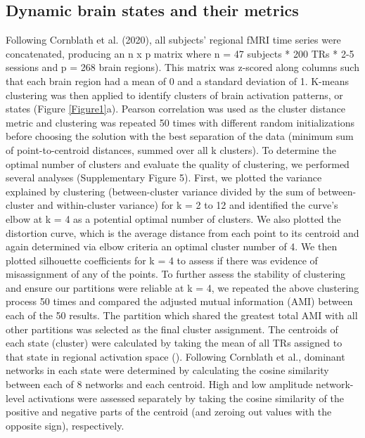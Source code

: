 \documentclass[phd,tocprelim]{cornell}
\begin{document}
	\subsection{Dynamic brain states and their metrics}
	 Following Cornblath et al. (2020), all subjects’ regional fMRI time series were concatenated, producing an n x p matrix where n = 47 subjects * 200 TRs * 2-5 sessions and p = 268 brain regions). This matrix was z-scored along columns such that each brain region had a mean of 0 and a standard deviation of 1. K-means clustering was then applied to identify clusters of brain activation patterns, or states (Figure \ref{Figure1}a). Pearson correlation was used as the cluster distance metric and clustering was repeated 50 times with different random initializations before choosing the solution with the best separation of the data (minimum sum of point-to-centroid distances, summed over all k clusters). To determine the optimal number of clusters and evaluate the quality of clustering, we performed several analyses (Supplementary Figure 5). First, we plotted the variance explained by clustering (between-cluster variance divided by the sum of between-cluster and within-cluster variance) for k = 2 to 12 and identified the curve's elbow at k = 4 as a potential optimal number of clusters. We also plotted the distortion curve, which is the average distance from each point to its centroid and again determined via elbow criteria an optimal cluster number of 4. We then plotted silhouette coefficients for k = 4 to assess if there was evidence of misassignment of any of the points. To further assess the stability of clustering and ensure our partitions were reliable at k = 4, we repeated the above clustering process 50 times and compared the adjusted mutual information (AMI) between each of the 50 results. The partition which shared the greatest total AMI with all other partitions was selected as the final cluster assignment. The centroids of each state (cluster) were calculated by taking the mean of all TRs assigned to that state in regional activation space (\cite{Cornblath2020-nc}). Following Cornblath et al., dominant networks in each state were determined by calculating the cosine similarity between each of 8  networks and each centroid. High and low amplitude network-level activations were assessed separately by taking the cosine similarity of the positive and negative parts of the centroid (and zeroing out values with the opposite sign), respectively. 
	 
\end{document}
